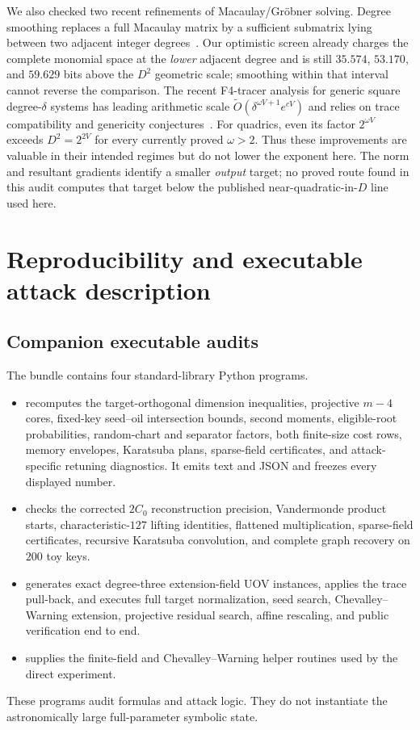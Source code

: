 \documentclass[11pt,a4paper]{article}
\theoremstyle{definition}
\theoremstyle{remark}
\begin{document}
We also checked two recent refinements of Macaulay/Gr\"obner solving.  Degree smoothing replaces a full Macaulay matrix by a sufficient submatrix lying between two adjacent integer degrees~\cite{DegreeSmoothing}.  Our optimistic screen already charges the complete monomial space at the \emph{lower} adjacent degree and is still $35.574$, $53.170$, and $59.629$ bits above the $D^2$ geometric scale; smoothing within that interval cannot reverse the comparison.  The recent F4-tracer analysis for generic square degree-$\delta$ systems has leading arithmetic scale $\widetilde O(\delta^{\omega V+1}e^{cV})$ and relies on trace compatibility and genericity conjectures~\cite{F4Tracer}.  For quadrics, even its factor $2^{\omega V}$ exceeds $D^2=2^{2V}$ for every currently proved $\omega>2$.  Thus these improvements are valuable in their intended regimes but do not lower the exponent here.  The norm and resultant gradients identify a smaller \emph{output} target; no proved route found in this audit computes that target below the published near-quadratic-in-$D$ line used here.

\section{Reproducibility and executable attack description}\label{app:algorithms}

\subsection{Companion executable audits}

The bundle contains four standard-library Python programs.
\begin{itemize}
\item {} recomputes the target-orthogonal dimension
inequalities, projective $m-4$ cores, fixed-key seed--oil intersection bounds,
second moments, eligible-root probabilities, random-chart and separator
factors, both finite-size cost rows, memory envelopes, Karatsuba plans,
sparse-field certificates, and attack-specific retuning diagnostics.  It emits
text and JSON and freezes every displayed number.
\item {} checks the corrected $2C_0$
reconstruction precision, Vandermonde product starts, characteristic-$127$
lifting identities, flattened multiplication, sparse-field certificates,
recursive Karatsuba convolution, and complete graph recovery on $200$ toy keys.
\item {} generates exact degree-three extension-field
UOV instances, applies the trace pull-back, and executes full target
normalization, seed search, Chevalley--Warning extension, projective residual
search, affine rescaling, and public verification end to end.
\item {} supplies the finite-field and
Chevalley--Warning helper routines used by the direct experiment.
\end{itemize}
These programs audit formulas and attack logic.  They do not instantiate the
astronomically large full-parameter symbolic state.
\end{document}
